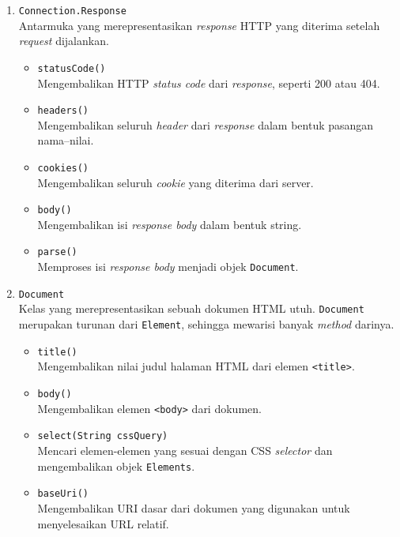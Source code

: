 \begin{enumerate}[label=\alph*.]
    \item \texttt{Connection.Response}\\
    Antarmuka yang merepresentasikan \textit{response} HTTP yang diterima setelah \textit{request} dijalankan.
    \begin{itemize}
        \item \texttt{statusCode()}\\
        Mengembalikan HTTP \textit{status code} dari \textit{response}, seperti 200 atau 404.
        \item \texttt{headers()}\\
        Mengembalikan seluruh \textit{header} dari \textit{response} dalam bentuk pasangan nama–nilai.
        \item \texttt{cookies()}\\
        Mengembalikan seluruh \textit{cookie} yang diterima dari server.
        \item \texttt{body()}\\
        Mengembalikan isi \textit{response body} dalam bentuk string.
        \item \texttt{parse()}\\
        Memproses isi \textit{response body} menjadi objek \texttt{Document}.
    \end{itemize}

    \item \texttt{Document}\\
    Kelas yang merepresentasikan sebuah dokumen HTML utuh. \texttt{Document} merupakan turunan dari \texttt{Element}, sehingga mewarisi banyak \textit{method} darinya.
    \begin{itemize}
        \item \texttt{title()}\\
        Mengembalikan nilai judul halaman HTML dari elemen \texttt{<title>}.
        \item \texttt{body()}\\
        Mengembalikan elemen \texttt{<body>} dari dokumen.
        \item \texttt{select(String cssQuery)}\\
        Mencari elemen-elemen yang sesuai dengan CSS \textit{selector} dan mengembalikan objek \texttt{Elements}.
        \item \texttt{baseUri()}\\
        Mengembalikan URI dasar dari dokumen yang digunakan untuk menyelesaikan URL relatif.
    \end{itemize}


\end{enumerate}
